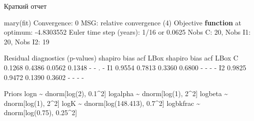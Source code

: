 \documentclass[
  letterpaper,
  DIV=11,
  numbers=noendperiod]{scrreprt}
\newenvironment{Shaded}{\begin{snugshade}}{\end{snugshade}}
\newcommand{\ControlFlowTok}[1]{\textcolor[rgb]{0.00,0.23,0.31}{\textbf{#1}}}
\newcommand{\DecValTok}[1]{\textcolor[rgb]{0.68,0.00,0.00}{#1}}
\newcommand{\FloatTok}[1]{\textcolor[rgb]{0.68,0.00,0.00}{#1}}
\newcommand{\FunctionTok}[1]{\textcolor[rgb]{0.28,0.35,0.67}{#1}}
\newcommand{\NormalTok}[1]{\textcolor[rgb]{0.00,0.23,0.31}{#1}}
\newcommand{\SpecialCharTok}[1]{\textcolor[rgb]{0.37,0.37,0.37}{#1}}
\begin{document}
Краткий отчет

\begin{Shaded}
\begin{Highlighting}[]
\FunctionTok{mary}\NormalTok{(fit)}
\NormalTok{Convergence}\SpecialCharTok{:} \DecValTok{0}\NormalTok{  MSG}\SpecialCharTok{:}\NormalTok{ relative }\FunctionTok{convergence}\NormalTok{ (}\DecValTok{4}\NormalTok{)}
\NormalTok{Objective }\ControlFlowTok{function}\NormalTok{ at optimum}\SpecialCharTok{:} \SpecialCharTok{{-}}\FloatTok{4.8303552}
\NormalTok{Euler time }\FunctionTok{step}\NormalTok{ (years)}\SpecialCharTok{:}  \DecValTok{1}\SpecialCharTok{/}\DecValTok{16}\NormalTok{ or }\FloatTok{0.0625}
\NormalTok{Nobs C}\SpecialCharTok{:} \DecValTok{20}\NormalTok{,  Nobs I1}\SpecialCharTok{:} \DecValTok{20}\NormalTok{,  Nobs I2}\SpecialCharTok{:} \DecValTok{19}

\NormalTok{Residual }\FunctionTok{diagnostics}\NormalTok{ (p}\SpecialCharTok{{-}}\NormalTok{values)}
\NormalTok{    shapiro   bias    acf   LBox shapiro bias acf LBox  }
\NormalTok{ C   }\FloatTok{0.1268} \FloatTok{0.4386} \FloatTok{0.0562} \FloatTok{0.1348}       \SpecialCharTok{{-}}    \SpecialCharTok{{-}}\NormalTok{   .    }\SpecialCharTok{{-}}  
\NormalTok{ I1  }\FloatTok{0.9554} \FloatTok{0.7813} \FloatTok{0.3360} \FloatTok{0.6800}       \SpecialCharTok{{-}}    \SpecialCharTok{{-}}   \SpecialCharTok{{-}}    \SpecialCharTok{{-}}  
\NormalTok{ I2  }\FloatTok{0.9825} \FloatTok{0.9472} \FloatTok{0.1390} \FloatTok{0.3602}       \SpecialCharTok{{-}}    \SpecialCharTok{{-}}   \SpecialCharTok{{-}}    \SpecialCharTok{{-}}  

\NormalTok{Priors}
\NormalTok{      logn  }\SpecialCharTok{\textasciitilde{}}\NormalTok{  dnorm[}\FunctionTok{log}\NormalTok{(}\DecValTok{2}\NormalTok{), }\FloatTok{0.1}\SpecialCharTok{\^{}}\DecValTok{2}\NormalTok{]}
\NormalTok{  logalpha  }\SpecialCharTok{\textasciitilde{}}\NormalTok{  dnorm[}\FunctionTok{log}\NormalTok{(}\DecValTok{1}\NormalTok{), }\DecValTok{2}\SpecialCharTok{\^{}}\DecValTok{2}\NormalTok{]}
\NormalTok{   logbeta  }\SpecialCharTok{\textasciitilde{}}\NormalTok{  dnorm[}\FunctionTok{log}\NormalTok{(}\DecValTok{1}\NormalTok{), }\DecValTok{2}\SpecialCharTok{\^{}}\DecValTok{2}\NormalTok{]}
\NormalTok{      logK  }\SpecialCharTok{\textasciitilde{}}\NormalTok{  dnorm[}\FunctionTok{log}\NormalTok{(}\FloatTok{148.413}\NormalTok{), }\FloatTok{0.7}\SpecialCharTok{\^{}}\DecValTok{2}\NormalTok{]}
\NormalTok{ logbkfrac  }\SpecialCharTok{\textasciitilde{}}\NormalTok{  dnorm[}\FunctionTok{log}\NormalTok{(}\FloatTok{0.75}\NormalTok{), }\FloatTok{0.25}\SpecialCharTok{\^{}}\DecValTok{2}\NormalTok{]}


\end{Highlighting}
\end{Shaded}
\end{document}
